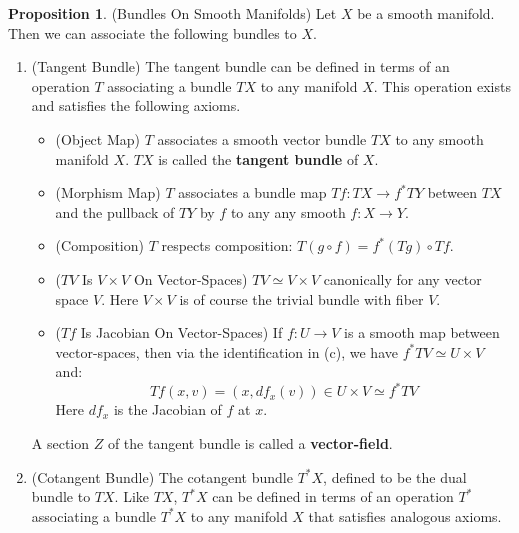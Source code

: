 \documentclass[12pt]{article}
\theoremstyle{definition}
\newtheorem{proposition}[theorem]{Proposition}
\numberwithin{equation}{section}
\begin{document}
\begin{proposition} \label{def:bundles_on_smooth_manifolds} (Bundles On Smooth Manifolds) Let $X$ be a smooth manifold. Then we can associate the following bundles to $X$.
\begin{enumerate}
	\item[(1)] (Tangent Bundle) The tangent bundle can be defined in terms of an operation $T$ associating a bundle $TX$ to any manifold $X$. This operation exists and satisfies the following axioms.
	\begin{itemize}
	\item[(a)] (Object Map) $T$ associates a smooth vector bundle $TX$ to any smooth manifold $X$. $TX$ is called the {\bf tangent bundle} of $X$.
	\item[(b)] (Morphism Map) $T$ associates a bundle map $Tf:TX \to f^*TY$ between $TX$ and the pullback of $TY$ by $f$ to any any smooth $f:X \to Y$.
	\item[(c)] (Composition) $T$ respects composition: $T(g \circ f) = f^*(Tg) \circ Tf$.
	\item[(d)] ($TV$ Is $V \times V$ On Vector-Spaces) $TV \simeq V \times V$ canonically for any vector space $V$. Here $V \times V$ is of course the trivial bundle with fiber $V$. 
	\item[(e)] ($Tf$ Is Jacobian On Vector-Spaces) If $f:U \to V$ is a smooth map between vector-spaces, then via the identification in (c), we have $f^*TV \simeq U \times V$ and:
	\[
	Tf(x,v) = (x,df_x(v)) \in U \times V \simeq f^*TV
	\]
	Here $df_x$ is the Jacobian of $f$ at $x$.
	\end{itemize}
	A section $Z$ of the tangent bundle is called a {\bf vector-field}.

	\item[(2)] (Cotangent Bundle) The cotangent bundle $T^*X$, defined to be the dual bundle to $TX$. Like $TX$, $T^*X$ can be defined in terms of an operation $T^*$ associating a bundle $T^*X$ to any manifold $X$ that satisfies analogous axioms.


\end{enumerate}
\end{proposition}
\end{document}
